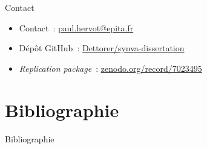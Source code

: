 \documentclass[usenames,dvipsnames,10pt]{beamer}
\begin{document}

\begin{frame}{Contact}
    \begin{itemize}
        \item Contact : \href{mailto:paul.hervot@epita.fr}{paul.hervot@epita.fr}
        \item Dépôt GitHub :
            \href{https://github.com/Dettorer/synva-dissertation}{Dettorer/synva-dissertation}
        \item \emph{Replication package} :
            \href{https://zenodo.org/record/7023495}{zenodo.org/record/7023495}
    \end{itemize}

\end{frame}

\section{Bibliographie}

\begin{frame}[allowframebreaks]{Bibliographie}
    \printbibliography{}
\end{frame}
\end{document}
